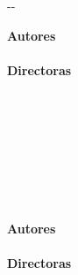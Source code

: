 {\begin{cambiamargen}{-\cambioIzquierdo}{-\cambioDerecho}
\vfill

\begin{large}
\begin{center}
{\Large \bfseries Autores}\\
\textbf{\autorPortadaVal}\\[0.5cm]
{\Large \bfseries Directoras}\\
\textbf{\directorPortadaVal}\\[0.5cm]
\textbf{\institucionVal}\\[1em]
\end{center}
\end{large}

\vfill

\end{cambiamargen}

\newpage

\thispagestyle{empty}
\mbox{ }


\newpage

\thispagestyle{empty}

\mbox{ }

\begin{Huge}
\begin{center}
\tituloPortadaVal
\end{center}
\end{Huge}

\vfill

\begin{large}
\begin{center}
\textoPrimerSubtituloPortadaVal
\mbox{ } \\ \mbox{ } \\ 
{\Large \bfseries Autores}\\
\textbf{\autorPortadaVal}\\[1.0cm]
{\Large \bfseries Directoras}\\
\textbf{\directorPortadaVal}\\[0.3cm]
\mbox{ } \\ \mbox{ } \\ 
\end{center}
\end{large}

}
